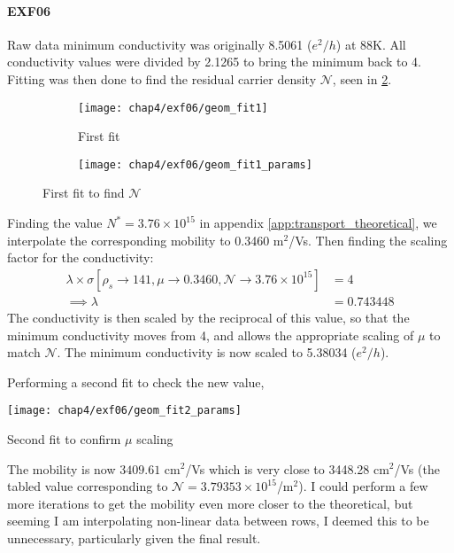 \documentclass[../Matt_Gebert_Honours_Thesis.tex]{subfiles}
\begin{document}
	\paragraph{EXF06}
	Raw data minimum conductivity was originally 8.5061 ($e^2/h$) at 88K. All conductivity values were divided by 2.1265 to bring the minimum back to 4. Fitting was then done to find the residual carrier density $\mathcal{N}$, seen in \cref{fig:geomfit1}.
	\begin{figure}[H]
		\begin{subfigure}[b]{0.6\textwidth}
			\centering
			\texttt{[image: chap4/exf06/geom\_fit1]}
			\caption{First fit}
		\end{subfigure}
		\begin{subfigure}[b]{0.4\textwidth}
			\centering
			\texttt{[image: chap4/exf06/geom\_fit1\_params]}
			\label{fig:geomfit1params}		
		\end{subfigure}
		\caption[Geometric factor fitting to find $\mathcal{N}$]{First fit to find $\mathcal{N}$}\label{fig:geomfit1}
	\end{figure}
	Finding the value $N^{*} = 3.76\times10^{15}$ in appendix \ref{app:transport_theoretical}, we interpolate the corresponding mobility to 0.3460 m$^2$/Vs. Then finding the scaling factor for the conductivity:
	\begin{align}
		\lambda \times \sigma\left[\rho_{s}\to 141, \mu\to 0.3460, \mathcal{N}\to 3.76\times 10^{15}\right] &= 4\\
		\implies \lambda &= 0.743448
	\end{align}
	The conductivity is then scaled by the reciprocal of this value, so that the minimum conductivity moves from 4, and allows the appropriate scaling of $\mu$ to match $\mathcal{N}$. The minimum conductivity is now scaled to 5.38034 ($e^2/h$).
	
	Performing a second fit to check the new value,
	\begin{table}[H]
		\centering
		\texttt{[image: chap4/exf06/geom\_fit2\_params]}
		\caption[Geometric factor fitting to find $\mu$]{Second fit to confirm $\mu$ scaling}\label{fig:geomfit2}
	\end{table}
	The mobility is now $3409.61$ cm$^2$/Vs which is very close to 3448.28 cm$^2$/Vs (the tabled value corresponding to $\mathcal{N}=3.79353\times10^{15}$/m$^2$). I could perform a few more iterations to get the mobility even more closer to the theoretical, but seeming I am interpolating non-linear data  between rows, I deemed this to be unnecessary, particularly given the final result.
\end{document}
